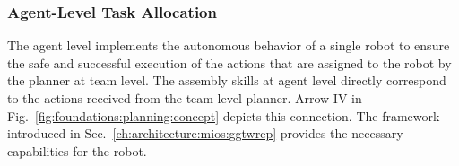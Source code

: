 \subsubsection{Agent-Level Task Allocation}

The agent level implements the autonomous behavior of a single robot to ensure the safe and successful execution of the actions that are assigned to the robot by the planner at team level.
The assembly skills at agent level directly correspond to the actions received from the team-level planner.
Arrow IV in Fig.~\ref{fig:foundations:planning:concept} depicts this connection.
The \skillmodelabbr{} framework introduced in Sec.~\ref{ch:architecture:mios:ggtwrep} provides the necessary capabilities for the robot.